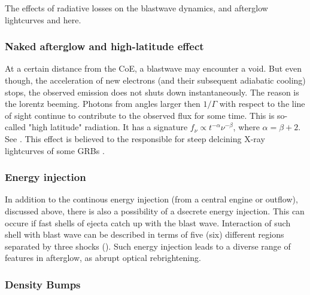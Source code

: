 The effects of radiative losses on the blastwave dynamics, and afterglow lightcurves
\cite{e.g. Rees and Meszaros, 1998; Dermer et al., 1999; Meszaros and Rees, 1999; Huang et al., 1999; Bottcher and Dermer, 2000; Nava et al., 2013} and  here.


\subsubsection{Naked afterglow and high-latitude effect}

At a certain distance from the CoE, a blastwave may encounter a void. But even though, the acceleration of new electrons (and their subsequent adiabatic cooling) stops, the observed emission does not shuts down instantaneously. The reason is the lorentz beeming. Photons from angles larger then $1/\Gamma$ with respect to the line of sight continue to contribute to the observed flux for some time. This is so-called "high latitude" radiation. It has a signature $f_{\nu}\propto t^{-\alpha}\nu^{-\beta}$, where $\alpha= \beta + 2$. See \cite{Fenimore et al. (1996); Kumar and Panaitescu (2000a); Dermer (2004)}.
This effect is believed to the responsible for steep delcining X-ray lightcurves of some GRBs \cite{Zhang et al., 2006}.


\subsubsection{Energy injection}

In addition to the continous energy injection (from a central engine or outflow), discussed above, there is also a possibility of a dsecrete energy injection. This can occure if fast shells of ejecta catch up with the blast wave. Interaction of such shell with blast wave can be described in terms of five (six) different regions separated by three shocks \cite{(Kumar and Piran, 2000b)} (\cite{(Zhang and Meszaros, 2002c)}). 
Such energy injection leads to a diverse range of features in afterglow, as abrupt optical rebrightening. \cite{(e.g. Nardini et al., 2011} \cite{Zhang and Meszaros, 2002c}


\subsubsection{Density Bumps}

